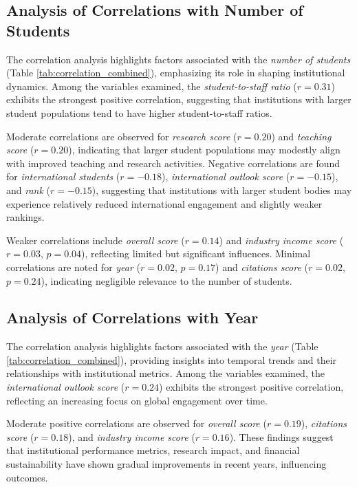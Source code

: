 \documentclass[conference]{IEEEtran}
\begin{document}
\subsection{Analysis of Correlations with Number of Students}

The correlation analysis highlights factors associated with the \textit{number of students} (Table \ref{tab:correlation_combined}), emphasizing its role in shaping institutional dynamics. Among the variables examined, the \textit{student-to-staff ratio} ($r = 0.31$) exhibits the strongest positive correlation, suggesting that institutions with larger student populations tend to have higher student-to-staff ratios.

Moderate correlations are observed for \textit{research score} ($r = 0.20$) and \textit{teaching score} ($r = 0.20$), indicating that larger student populations may modestly align with improved teaching and research activities. Negative correlations are found for \textit{international students} ($r = -0.18$), \textit{international outlook score} ($r = -0.15$), and \textit{rank} ($r = -0.15$), suggesting that institutions with larger student bodies may experience relatively reduced international engagement and slightly weaker rankings.

Weaker correlations include \textit{overall score} ($r = 0.14$) and \textit{industry income score} ($r = 0.03$, $p = 0.04$), reflecting limited but significant influences. Minimal correlations are noted for \textit{year} ($r = 0.02$, $p = 0.17$) and \textit{citations score} ($r = 0.02$, $p = 0.24$), indicating negligible relevance to the number of students.


\subsection{Analysis of Correlations with Year}

The correlation analysis highlights factors associated with the \textit{year} (Table \ref{tab:correlation_combined}), providing insights into temporal trends and their relationships with institutional metrics. Among the variables examined, the \textit{international outlook score} ($r = 0.24$) exhibits the strongest positive correlation, reflecting an increasing focus on global engagement over time.

Moderate positive correlations are observed for \textit{overall score} ($r = 0.19$), \textit{citations score} ($r = 0.18$), and \textit{industry income score} ($r = 0.16$). These findings suggest that institutional performance metrics, research impact, and financial sustainability have shown gradual improvements in recent years, influencing outcomes.
\end{document}
